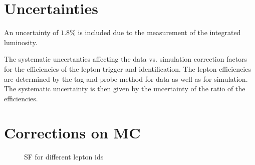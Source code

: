 \section{Uncertainties}

An uncertainty of $1.8\%$ is included due to the measurement of
the integrated luminosity.

The systematic uncertanties affecting the data vs. simulation correction factors
for the efficiencies of the lepton trigger and identification. The lepton
efficiencies are determined by the tag-and-probe method for data as well as for
simulation. The systematic uncertainty is then given by the uncertainty of
the ratio of the efficiencies.



\section{Corrections on MC}

\begin{figure}[tph]
  \centering
  \caption{SF for different lepton ids}
  \label{fig:leptonidsf}
\end{figure}


